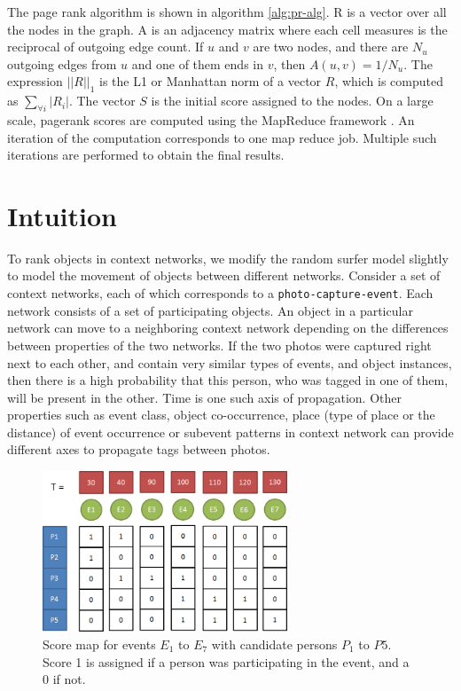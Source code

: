 The page rank algorithm is shown in algorithm \ref{alg:pr-alg}. R is a vector over all the nodes in the graph. A is an adjacency matrix where each cell measures is the reciprocal of outgoing edge count. If $u$ and $v$ are two nodes, and there are $N_u$ outgoing edges from $u$ and one of them ends in $v$, then $A(u, v) = 1/N_u$. The expression $||R||_1$ is the L1 or Manhattan norm of a vector $R$, which is computed as $\sum_{\forall i} |R_i|$. The vector $S$ is the initial score assigned to the nodes. On a large scale, pagerank scores are computed using the MapReduce framework \cite{dean2008mapreduce}. An iteration of the computation corresponds to one map reduce job. Multiple such iterations are performed to obtain the final results.

\section{Intuition}

To rank objects in context networks, we modify the random surfer model slightly to model the movement of objects between different networks. Consider a set of context networks, each of which corresponds to a \texttt{photo-capture-event}. Each network consists of a set of participating objects. An object in a particular network can move to a neighboring context network depending on the differences between properties of the two networks. If the two photos were captured right next to each other, and contain very similar types of events, and object instances, then there is a high probability that this person, who was tagged in one of them, will be present in the other. Time is one such axis of propagation. Other properties such as event class, object co-occurrence, place (type of place or the distance) of event occurrence or subevent patterns in context network can provide different axes to propagate tags between photos.

\begin{figure}[t]
\centering
\includegraphics[width=0.65\textwidth]{media/chapter6/time-example-2.png}
\caption{Score map for events $E_1$ to $E_7$ with candidate persons $P_1$ to $P5$. Score 1 is assigned if a person was participating in the event, and a 0 if not.}
\label{fig:time-example}
\end{figure}


